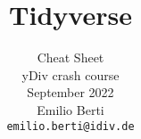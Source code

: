 \documentclass[final,hyperref={pdfpagelabels=false}]{beamer}
\title{Tidyverse}
\subtitle{\vspace{1ex}
            Cheat Sheet\\
            \vspace{1ex}
            yDiv crash course\\
            \vspace{1ex}
            September 2022\\
            \vspace{1ex}
            Emilio Berti\\
            \vspace{1ex}
            \texttt{emilio.berti@idiv.de}}
\begin{document}
  
  \begin{frame}[fragile]{} 
    \vfill
    \begin{columns}[t]
      \begin{column}{.30\linewidth}
        \maketitle
        
      \end{column}
      
      \begin{column}{.3\linewidth}
        
      \end{column}
      
      \begin{column}{.4\linewidth}
        
      \end{column}
    \end{columns}
    \vfill
  \end{frame}
  \begin{frame}[fragile]{}
  \vfill
    \begin{columns}[t]
    \begin{column}{.9\linewidth}
      
    \end{column}
    \end{columns}
  \end{frame}
      
            
\end{document}
